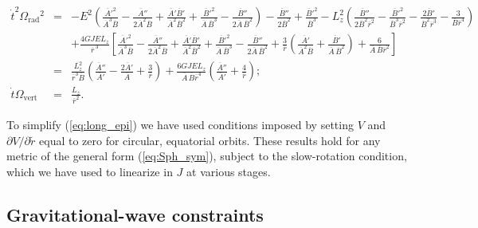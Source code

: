\documentclass[aps,prd,amsfonts,amssymb,amsmath,nofootinbib,reprint,showpacs]{revtex4-1}
\newcommand{\eqnref}[1]{(\ref{eq:#1})}
\newcommand{\sub}[1]{\ensuremath{_\text{#1}}}
\begin{document}
\begin{widetext}
\begin{eqnarray}
\dot{t}^2\Omega\sub{rad}^2 & = & -E^2 \left( \frac{\overline{A}'^2}{\overline{A}^3 \overline{B}} - \frac{\overline{A}''}{2\overline{A}^2\overline{B}} + \frac{\overline{A}'\overline{B}'}{\overline{A}^2\overline{B}^2} + \frac{\overline{B}'^2}{\overline{A}\,\overline{B}^3} - \frac{\overline{B}''}{2\overline{A}\,\overline{B}^2} \right) - \frac{\overline{B}''}{2\overline{B}^2} +  \frac{\overline{B}'^2}{\overline{B}^3} - L_z^2 \left(\frac{\overline{B}''}{2\overline{B}^2 \overline{r}^2} - \frac{\overline{B}'^2}{\overline{B}^3 \overline{r}^2} - \frac{2\overline{B}'}{\overline{B}^2 \overline{r}^3}-\frac{3}{\overline{B} \overline{r}^4} \right) \nonumber \\
 & & + \frac{4GJEL_z}{\overline{r}^{\,3}} \left[ \frac{\overline{A}'^2}{\overline{A}^3 \overline{B}} - \frac{\overline{A}''}{2\overline{A}^2\overline{B}} + \frac{\overline{A}'\overline{B}'}{\overline{A}^2\overline{B}^2} + \frac{\overline{B}'^2}{\overline{A}\,\overline{B}^3} - \frac{\overline{B}''}{2\overline{A}\,\overline{B}^2} +\frac{3}{\overline{r}}\left(\frac{\overline{A}'}{\overline{A}^2\overline{B}}+\frac{\overline{B}'}{\overline{A}\,\overline{B}^2}\right) +\frac{6}{\overline{A}\,\overline{B}\overline{r}^2}\right] \label{eq:long_epi} \\
 & = &  \frac{L_z^2}{\overline{r}^3\overline{B}}\left(\frac{\overline{A}''}{\overline{A}'} - \frac{2\overline{A}'}{\overline{A}} + \frac{3}{\overline{r}}\right) +\frac{6GJEL_z}{\overline{A}\,\overline{B} \overline{r}^4} \left(\frac{\overline{A}''}{\overline{A}'} + \frac{4}{\overline{r}}\right); \\
\dot{t}\Omega\sub{vert} & = & \frac{L_z}{\overline{r}^2}.
\end{eqnarray}
\end{widetext}
To simplify \eqnref{long_epi} we have used conditions imposed by setting $V$ and $\partial V/\partial \widetilde{r}$ equal to zero for circular, equatorial orbits. These results hold for any metric of the general form \eqnref{Sph_sym}, subject to the slow-rotation condition, which we have used to linearize in $J$ at various stages.

\subsection{Gravitational-wave constraints}
\end{document}
